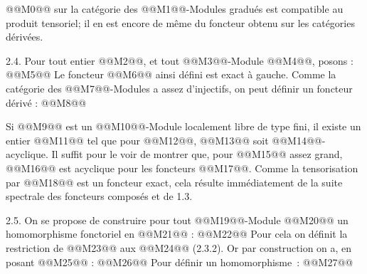 
@@M0@@ sur la catégorie des @@M1@@-Modules gradués est compatible au produit tensoriel; il en est encore de même du foncteur obtenu sur les catégories dérivées.


2.4. Pour tout entier @@M2@@, et tout @@M3@@-Module @@M4@@, posons :
@@M5@@
Le foncteur @@M6@@ ainsi défini est exact à gauche. Comme la catégorie des @@M7@@-Modules a assez d'injectifs, on peut définir un foncteur dérivé :
@@M8@@

Si @@M9@@ est un @@M10@@-Module localement libre de type fini, il existe un entier @@M11@@ tel que pour @@M12@@, @@M13@@ soit @@M14@@-acyclique. Il suffit pour le voir de montrer que, pour @@M15@@ assez grand, @@M16@@ est acyclique pour les foncteurs @@M17@@. Comme la tensorisation par @@M18@@ est un foncteur exact, cela résulte immédiatement de la suite spectrale des foncteurs composés et de 1.3.

2.5. On se propose de construire pour tout @@M19@@-Module @@M20@@ un homomorphisme fonctoriel en @@M21@@ :
@@M22@@
Pour cela on définit la restriction de @@M23@@ aux @@M24@@ (2.3.2). Or par construction on a, en posant @@M25@@ :
@@M26@@
Pour définir un homomorphisme~:
@@M27@@
